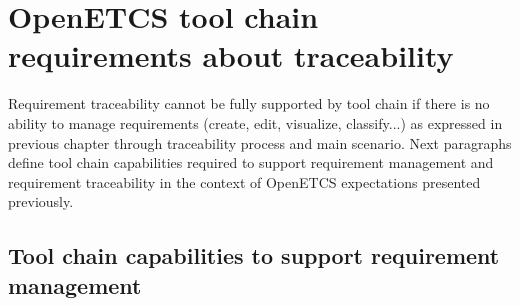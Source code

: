 \documentclass[11pt]{template/openetcs_report}
\begin{document}
\chapter{OpenETCS tool chain requirements about traceability}
\label{sec-3} 
Requirement traceability cannot be fully supported by tool chain if there is no ability to manage requirements (create, edit, visualize, classify...) as expressed in previous chapter through traceability process and main scenario.
Next paragraphs define tool chain capabilities required to support requirement management and requirement traceability in the context of OpenETCS expectations presented previously.

\section{Tool chain capabilities to support requirement management}
\end{document}
